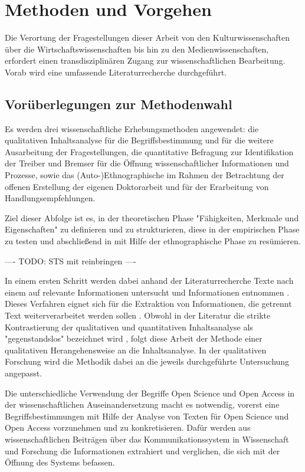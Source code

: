 \chapter{Methoden und Vorgehen}

Die Verortung der Fragestellungen dieser Arbeit von den Kulturwissenschaften über die Wirtschaftswissenschaften bis hin zu den Medienwissenschaften, erfordert einen transdisziplinären Zugang zur wissenschaftlichen Bearbeitung. Vorab wird eine umfassende Literaturrecherche durchgeführt.

\section{Vorüberlegungen zur Methodenwahl}

Es werden drei wissenschaftliche Erhebungsmethoden angewendet: die qualitativen Inhaltsanalyse für die Begriffsbestimmung und für die weitere Ausarbeitung der Fragestellungen, die quantitative Befragung zur Identifikation der Treiber und Bremser für die Öffnung wissenschaftlicher Informationen und Prozesse, sowie das (Auto-)Ethnographische im Rahmen der Betrachtung der offenen Erstellung der eigenen Doktorarbeit und für der Erarbeitung von Handlungsempfehlungen.

Ziel dieser Abfolge ist es, in der theoretischen Phase "Fähigkeiten, Merkmale und Eigenschaften" zu definieren und zu strukturieren, diese in der empirischen Phase zu testen \cite{raab_2012_fragebogen} und abschließend in mit Hilfe der ethnographische Phase zu resümieren.

---- TODO: STS mit reinbringen ----

In einem ersten Schritt werden dabei anhand der Literaturrecherche Texte nach einem auf relevante Informationen untersucht und Informationen entnommen \cite{glaser_1999_theorie_analyse}. Dieses Verfahren eignet sich für die Extraktion von Informationen, die getrennt Text weiterverarbeitet werden sollen \cite{glaser_1999_theorie_analyse}. Obwohl in der Literatur die strikte Kontrastierung der qualitativen und quantitativen Inhaltsanalyse als "gegenstandslos" bezeichnet wird \cite{frueh_2011_inhaltsanalyse}, folgt diese Arbeit der Methode einer qualitativen Herangehensweise an die Inhaltsanalyse. In der qualitativen Forschung wird die Methodik dabei an die jeweils durchgeführte Untersuchung angepasst.

Die unterschiedliche Verwendung der Begriffe Open Science und Open Access in der wissenschaftlichen Auseinandersetzung macht es notwendig, vorerst eine Begriffsbestimmungen mit Hilfe der Analyse von Texten für Open Science und Open Access vorzunehmen und zu konkretisieren. Dafür werden aus wissenschaftlichen Beiträgen über das Kommunikationssystem in Wissenschaft und Forschung die Informationen extrahiert und verglichen, die sich mit der Öffnung des Systems befassen.

